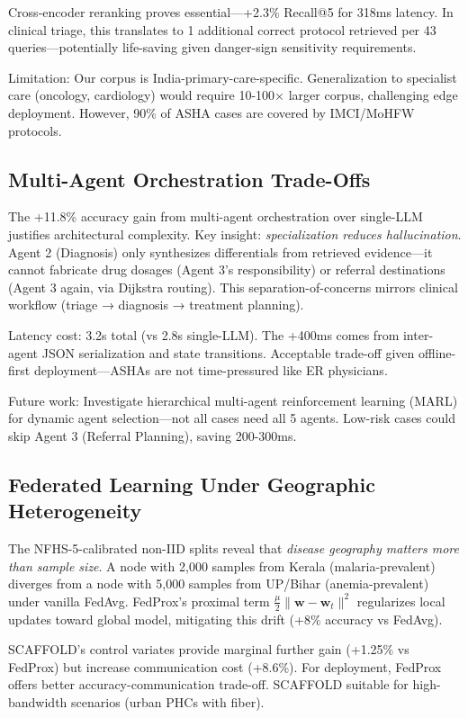 \documentclass[conference,compsoc]{IEEEtran}
\begin{document}
Cross-encoder reranking proves essential—+2.3\% Recall@5 for 318ms latency. In clinical triage, this translates to 1 additional correct protocol retrieved per 43 queries—potentially life-saving given danger-sign sensitivity requirements.

Limitation: Our corpus is India-primary-care-specific. Generalization to specialist care (oncology, cardiology) would require 10-100× larger corpus, challenging edge deployment. However, 90\% of ASHA cases are covered by IMCI/MoHFW protocols.

\subsection{Multi-Agent Orchestration Trade-Offs}

The +11.8\% accuracy gain from multi-agent orchestration over single-LLM justifies architectural complexity. Key insight: \textit{specialization reduces hallucination}. Agent 2 (Diagnosis) only synthesizes differentials from retrieved evidence—it cannot fabricate drug dosages (Agent 3's responsibility) or referral destinations (Agent 3 again, via Dijkstra routing). This separation-of-concerns mirrors clinical workflow (triage → diagnosis → treatment planning).

Latency cost: 3.2s total (vs 2.8s single-LLM). The +400ms comes from inter-agent JSON serialization and state transitions. Acceptable trade-off given offline-first deployment—ASHAs are not time-pressured like ER physicians.

Future work: Investigate hierarchical multi-agent reinforcement learning (MARL) for dynamic agent selection—not all cases need all 5 agents. Low-risk cases could skip Agent 3 (Referral Planning), saving 200-300ms.

\subsection{Federated Learning Under Geographic Heterogeneity}

The NFHS-5-calibrated non-IID splits reveal that \textit{disease geography matters more than sample size}. A node with 2,000 samples from Kerala (malaria-prevalent) diverges from a node with 5,000 samples from UP/Bihar (anemia-prevalent) under vanilla FedAvg. FedProx's proximal term \(\frac{\mu}{2} \|\mathbf{w} - \mathbf{w}_t\|^2\) regularizes local updates toward global model, mitigating this drift (+8\% accuracy vs FedAvg).

SCAFFOLD's control variates provide marginal further gain (+1.25\% vs FedProx) but increase communication cost (+8.6\%). For deployment, FedProx offers better accuracy-communication trade-off. SCAFFOLD suitable for high-bandwidth scenarios (urban PHCs with fiber).
\end{document}
